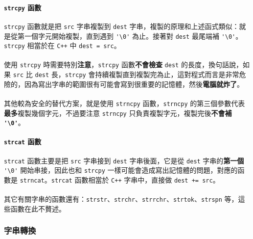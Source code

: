 \documentclass[12pt,a4paper,oneside]{article}
\begin{document}
\begin{CJK}{UTF8}{bkai}
\paragraph{\lstinline!strcpy! 函數}\lstinline!strcpy! 函數就是把 \lstinline!src! 字串複製到 \lstinline!dest! 字串，複製的原理和上述函式類似：就是從第一個字元開始複製，直到遇到 \lstinline!'\0'! 為止。接著對 \lstinline!dest! 最尾端補 \lstinline!'\0'!。\lstinline!strcpy! 相當於在 \texttt{C++} 中 \lstinline!dest = src!。
\paragraph{}使用 \lstinline!strcpy! 時需要特別{\color{blue}\textbf{注意}}，\lstinline!strcpy! 函數{\color{red}\textbf{不會檢查}} \lstinline!dest! 的長度，換句話說，如果 \lstinline!src! 比 \lstinline!dest! 長，\lstinline!strcpy! 會持續複製直到複製完為止，這對程式而言是非常危險的，因為寫出字串的範圍很有可能會寫到很重要的記憶體，然後{\color{red}\textbf{電腦就炸了}}。
\paragraph{}其他較為安全的替代方案，就是使用 \lstinline!strncpy! 函數，\lstinline!strncpy! 的第三個參數代表\textbf{最多}複製幾個字元，不過要注意 \lstinline!strncpy! 只負責複製字元，複製完後{\color{blue}\textbf{不會補 \lstinline!'\0'!}}。

\paragraph{\lstinline!strcat! 函數}\lstinline!strcat! 函數主要是把 \lstinline!src! 字串接到 \lstinline!dest! 字串後面，它是從 \lstinline!dest! 字串的\textbf{第一個} \lstinline!'\0'! 開始串接，因此也和 \lstinline!strcpy! 一樣可能會造成寫出記憶體的問題，對應的函數是 \lstinline!strncat!。\lstinline!strcat! 函數相當於 \texttt{C++} 字串中，直接做 \lstinline!dest += src!。

\paragraph{}其它有關字串的函數還有：\lstinline!strstr!、\lstinline!strchr!、\lstinline!strrchr!、\lstinline!strtok!、\lstinline!strspn! 等，這些函數在此不贅述。

\subsubsection{字串轉換}


\end{CJK}
\end{document}
